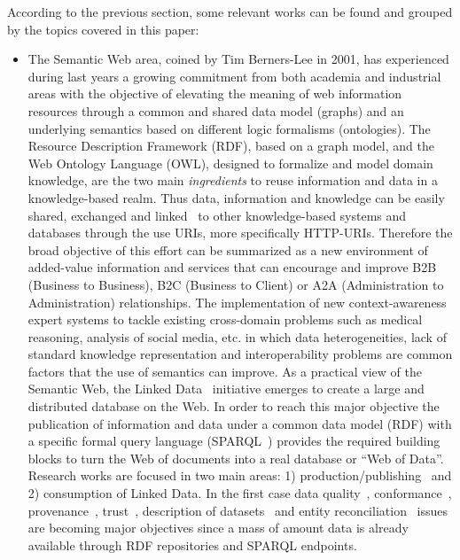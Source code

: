 According to the previous section, some relevant works can be found and grouped by the topics covered in this paper:

\begin{itemize}
 \item  The Semantic Web area, coined by Tim Berners-Lee in 2001, has experienced during last years a growing 
 commitment from both academia and industrial areas  with the objective of elevating the meaning of web 
 information resources through a common and shared data model (graphs) and an underlying semantics based 
 on different logic formalisms (ontologies). The Resource Description Framework (RDF), based on a graph model, and the Web Ontology Language (OWL), designed to formalize and model domain knowledge, are the two main \textit{ingredients} to reuse information and data 
 in a knowledge-based realm. Thus data, information and knowledge can be easily shared, exchanged and linked~\cite{Maali_Cyganiak_2011} 
 to other knowledge-based systems and databases through the use URIs, more specifically HTTP-URIs. Therefore the broad objective of this effort can be summarized 
 as a new environment of added-value information and services that can encourage and improve B2B (Business to Business), B2C (Business to Client) or 
 A2A (Administration to Administration) relationships. The implementation of new context-awareness expert systems to tackle existing 
 cross-domain problems such as medical reasoning, analysis of social media, etc. in which data heterogeneities, 
 lack of standard knowledge representation and interoperability problems are common factors that the use of semantics can improve. As a practical view of the Semantic Web, 
 the Linked Data~\cite{Berners-Lee-2006,Heath_Bizer_2011} initiative emerges to create a large and distributed database on the Web. 
 In order to reach this major objective the publication of information and data under a common data model (RDF) 
 with a specific formal query language (SPARQL~\cite{Sparql11}) provides the required building blocks to turn the Web of documents 
 into a real database or ``Web of Data''. Research works are focused in two main areas: 1) production/publishing~\cite{bizer07how} and 2) consumption of 
 Linked Data. In the first case data quality~\cite{bizer2007,Bizer2009QA,lodq,link-qa}, conformance~\cite{DBLP:journals/ws/HoganUHCPD12}, 
 provenance~\cite{w3c-prov,DBLP:conf/ipaw/HartigZ10}, trust~\cite{Carroll05namedgraphs}, description of 
 datasets~\cite{void,Cyganiak08semanticsitemaps,ckanValidator} and entity reconciliation~\cite{Serimi,Maali_Cyganiak_2011} issues are 
 becoming major objectives since a mass of amount data is already available through RDF repositories and SPARQL endpoints. 
 

\end{itemize}
